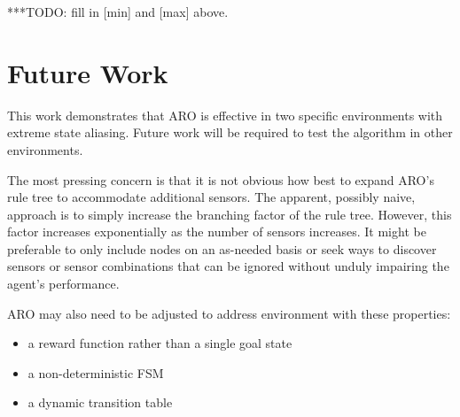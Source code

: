 \documentclass[letterpaper]{article} %
\begin{document}
***TODO:  fill in [min] and [max] above.

\section{Future Work}

This work demonstrates that ARO is effective in two specific
environments with extreme state aliasing.  Future work will be
required to test the algorithm in other environments.

The most pressing concern is that it is not obvious how best to expand
ARO's rule tree to accommodate additional sensors.  The apparent,
possibly naive, approach is to simply increase the branching factor of
the rule tree.  However, this factor increases exponentially as the
number of sensors increases.  It might be preferable to only include
nodes on an as-needed basis or seek ways to discover sensors or sensor
combinations that can be ignored without unduly impairing the agent's
performance.

ARO may also need to be adjusted to address environment with these
properties:
\begin{itemize}
\item a reward function rather than a single goal state
\item a non-deterministic FSM
\item a dynamic transition table
\end{itemize}

\begin{quote}
\begin{small}


\end{small}
\end{quote}
\end{document}
